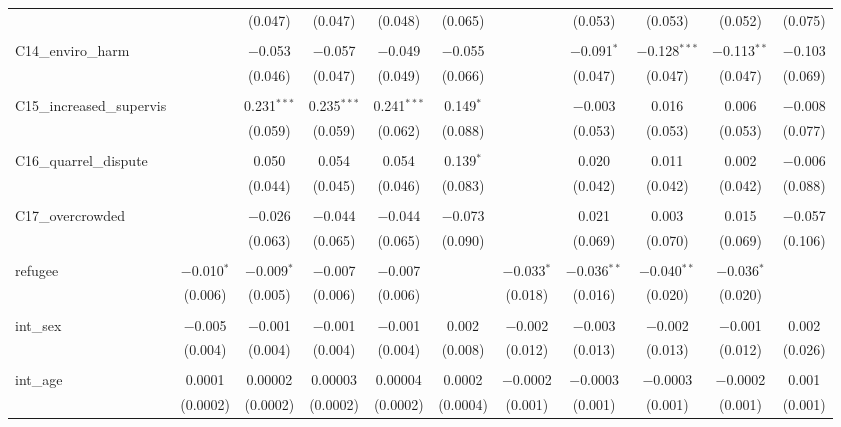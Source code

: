 \begin{table}[H]
\begin{tabular}{@{\extracolsep{4pt}}lcccccccccc}
  &  & (0.047) & (0.047) & (0.048) & (0.065) &  & (0.053) & (0.053) & (0.052) & (0.075) \\ 
  & & & & & & & & & & \\ 
 C14\_enviro\_harm &  & $-$0.053 & $-$0.057 & $-$0.049 & $-$0.055 &  & $-$0.091$^{*}$ & $-$0.128$^{***}$ & $-$0.113$^{**}$ & $-$0.103 \\ 
  &  & (0.046) & (0.047) & (0.049) & (0.066) &  & (0.047) & (0.047) & (0.047) & (0.069) \\ 
  & & & & & & & & & & \\ 
 C15\_increased\_supervis &  & 0.231$^{***}$ & 0.235$^{***}$ & 0.241$^{***}$ & 0.149$^{*}$ &  & $-$0.003 & 0.016 & 0.006 & $-$0.008 \\ 
  &  & (0.059) & (0.059) & (0.062) & (0.088) &  & (0.053) & (0.053) & (0.053) & (0.077) \\ 
  & & & & & & & & & & \\ 
 C16\_quarrel\_dispute &  & 0.050 & 0.054 & 0.054 & 0.139$^{*}$ &  & 0.020 & 0.011 & 0.002 & $-$0.006 \\ 
  &  & (0.044) & (0.045) & (0.046) & (0.083) &  & (0.042) & (0.042) & (0.042) & (0.088) \\ 
  & & & & & & & & & & \\ 
 C17\_overcrowded &  & $-$0.026 & $-$0.044 & $-$0.044 & $-$0.073 &  & 0.021 & 0.003 & 0.015 & $-$0.057 \\ 
  &  & (0.063) & (0.065) & (0.065) & (0.090) &  & (0.069) & (0.070) & (0.069) & (0.106) \\ 
  & & & & & & & & & & \\ 
 refugee & $-$0.010$^{*}$ & $-$0.009$^{*}$ & $-$0.007 & $-$0.007 &  & $-$0.033$^{*}$ & $-$0.036$^{**}$ & $-$0.040$^{**}$ & $-$0.036$^{*}$ &  \\ 
  & (0.006) & (0.005) & (0.006) & (0.006) &  & (0.018) & (0.016) & (0.020) & (0.020) &  \\ 
  & & & & & & & & & & \\ 
 int\_sex & $-$0.005 & $-$0.001 & $-$0.001 & $-$0.001 & 0.002 & $-$0.002 & $-$0.003 & $-$0.002 & $-$0.001 & 0.002 \\ 
  & (0.004) & (0.004) & (0.004) & (0.004) & (0.008) & (0.012) & (0.013) & (0.013) & (0.012) & (0.026) \\ 
  & & & & & & & & & & \\ 
 int\_age & 0.0001 & 0.00002 & 0.00003 & 0.00004 & 0.0002 & $-$0.0002 & $-$0.0003 & $-$0.0003 & $-$0.0002 & 0.001 \\ 
  & (0.0002) & (0.0002) & (0.0002) & (0.0002) & (0.0004) & (0.001) & (0.001) & (0.001) & (0.001) & (0.001) \\ 

\end{tabular}
\end{table}
